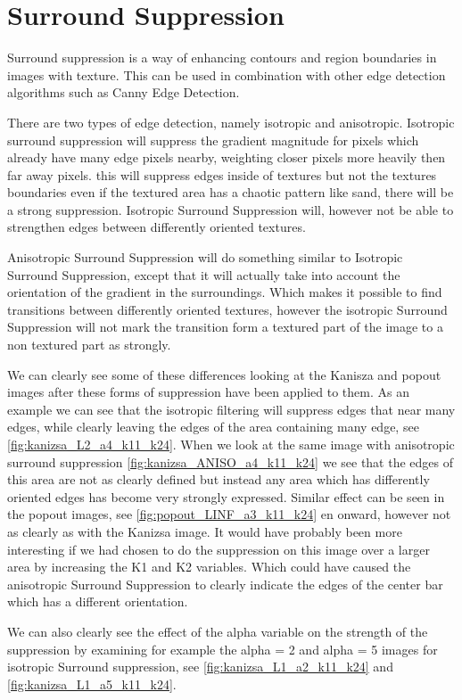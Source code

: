\documentclass[10pt,a4paper]{article}
\begin{document}
\section{Surround Suppression}
Surround suppression is a way of enhancing contours and region boundaries in images with texture. This can be used in combination with other edge detection algorithms such as Canny Edge Detection. 

There are two types of edge detection, namely isotropic and anisotropic. Isotropic surround suppression will suppress the gradient magnitude for pixels which already have many edge pixels nearby, weighting closer pixels more heavily then far away pixels. this will suppress edges inside of textures but not the textures boundaries even if the textured area has a chaotic pattern like sand, there will be a strong suppression. Isotropic Surround Suppression will, however not be able to strengthen edges between differently oriented textures.

Anisotropic Surround Suppression will do something similar to Isotropic Surround Suppression, except that it will actually take into account the orientation of the gradient in the surroundings. Which makes it possible to find transitions between differently oriented textures, however the isotropic Surround Suppression will not mark the transition form a textured part of the image to a non textured part as strongly.

We can clearly see some of these differences looking at the Kanisza and popout images after these forms of suppression have been applied to them. As an example we can see that the isotropic filtering will suppress edges that near many edges, while clearly leaving the edges of the area containing many edge, see \ref{fig:kanizsa_L2_a4_k11_k24}. When we look at the same image with anisotropic surround suppression \ref{fig:kanizsa_ANISO_a4_k11_k24} we see that the edges of this area are not as clearly defined but instead any area which has differently oriented edges has become very strongly expressed. Similar effect can be seen in the popout images, see \ref{fig:popout_LINF_a3_k11_k24} en onward, however not as clearly as with the Kanizsa image. It would have probably been more interesting if we had chosen to do the suppression on this image over a larger area by increasing the K1 and K2 variables. Which could have caused the anisotropic Surround Suppression to clearly indicate the edges of the center bar which has a different orientation.

We can also clearly see the effect of the alpha variable on the strength of the suppression by examining for example the alpha = 2 and alpha = 5 images for isotropic Surround suppression, see \ref{fig:kanizsa_L1_a2_k11_k24} and \ref{fig:kanizsa_L1_a5_k11_k24}.
\end{document}
